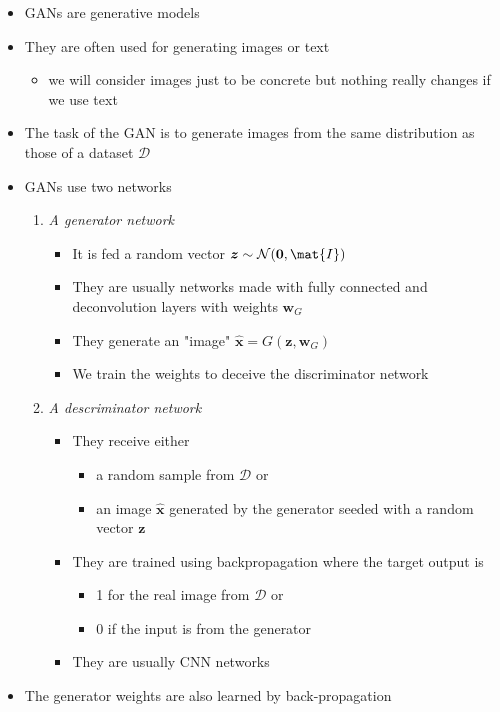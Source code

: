 \documentclass[11pt]{article}
\begin{document}
\begin{itemize}
\item GANs are generative models
\item They are often used for generating images or text
\begin{itemize}
\item we will consider images just to be concrete but nothing really
changes if we use text
\end{itemize}
\item The task of the GAN is to generate images from the same
distribution as those of a dataset \(\mathcal{D}\)
\item GANs use two networks
\begin{enumerate}
\item \emph{A generator network}
\begin{itemize}
\item It is fed a random vector \(\bm{z}\sim\mathcal{N}(\bm{0}, \mat{I})\)
\item They are usually networks made with fully
connected and deconvolution layers with
weights \(\bm{w}_G\)
\item They generate an "image" \(\hat{\bm{x}} = G(\bm{z}, \bm{w}_G)\)
\item We train the weights to deceive the discriminator network
\end{itemize}
\item \emph{A descriminator network}
\begin{itemize}
\item They receive either
\begin{itemize}
\item a random sample from \(\mathcal{D}\) or
\item an image \(\hat{\bm{x}}\) generated by the generator seeded
with a random vector \(\bm{z}\)
\end{itemize}
\item They are trained using backpropagation where the target
output is
\begin{itemize}
\item 1 for the real image from \(\mathcal{D}\) or
\item 0 if the input is from the generator
\end{itemize}
\item They are usually CNN networks
\end{itemize}
\end{enumerate}
\item The generator weights are also learned by back-propagation

\end{itemize}
\end{document}

